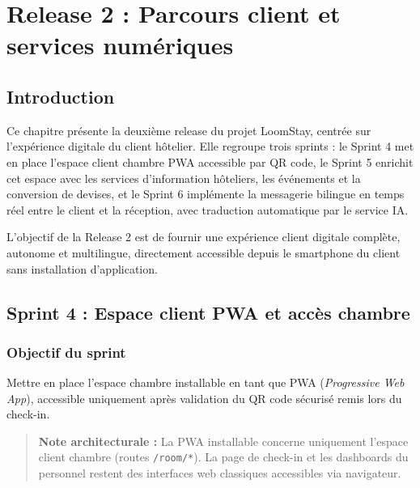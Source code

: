 
\chapter{Release 2 : Parcours client et services numériques}
\label{chap:release2}

\section*{Introduction}

Ce chapitre présente la deuxième release du projet LoomStay, centrée sur l'expérience digitale du client hôtelier. Elle regroupe trois sprints : le Sprint 4 met en place l'espace client chambre PWA accessible par QR code, le Sprint 5 enrichit cet espace avec les services d'information hôteliers, les événements et la conversion de devises, et le Sprint 6 implémente la messagerie bilingue en temps réel entre le client et la réception, avec traduction automatique par le service IA.

L'objectif de la Release 2 est de fournir une expérience client digitale complète, autonome et multilingue, directement accessible depuis le smartphone du client sans installation d'application.

\section{Sprint 4 : Espace client PWA et accès chambre}
\label{sec:sprint4}

\subsection{Objectif du sprint}

Mettre en place l'espace chambre installable en tant que PWA (\textit{Progressive Web App}), accessible uniquement après validation du QR code sécurisé remis lors du check-in.

\begin{quote}
\textbf{Note architecturale :} La PWA installable concerne uniquement l'espace client chambre (routes \texttt{/room/*}). La page de check-in et les dashboards du personnel restent des interfaces web classiques accessibles via navigateur.
\end{quote}

